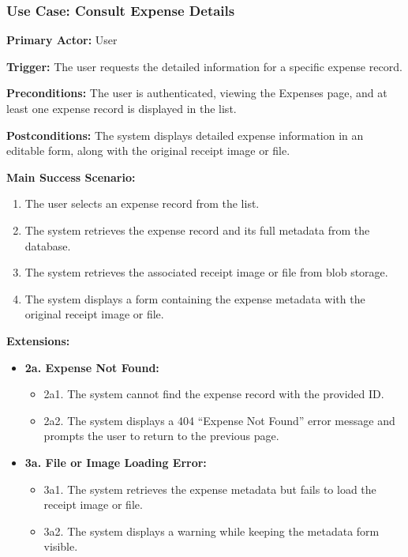 \subsubsection{\textbf{Use Case: Consult Expense Details}}

\textbf{Primary Actor:} User

\textbf{Trigger:} The user requests the detailed information for a specific expense record.

\textbf{Preconditions:} The user is authenticated, viewing the Expenses page, and at least one expense record is displayed in the list.

\textbf{Postconditions:} The system displays detailed expense information in an editable form, along with the original receipt image or file.

\vspace{0.5cm}

\textbf{Main Success Scenario:}

\begin{enumerate} [leftmargin=0.75cm, noitemsep]
    \item The user selects an expense record from the list.
    \item The system retrieves the expense record and its full metadata from the database.
    \item The system retrieves the associated receipt image or file from blob storage.
    \item The system displays a form containing the expense metadata with the original receipt image or file.
\end{enumerate}

\vspace{0.3cm}

\textbf{Extensions:}

\begin{itemize} [label={}, leftmargin=0.75cm, noitemsep]

    \item \textbf{2a. Expense Not Found:}
    \begin{itemize} [label={}, leftmargin=0.75cm, noitemsep]
        \item 2a1. The system cannot find the expense record with the provided ID.
        \item 2a2. The system displays a 404 ``Expense Not Found'' error message and prompts the user to return to the previous page.
    \end{itemize}

    \item \textbf{3a. File or Image Loading Error:}
    \begin{itemize} [label={}, leftmargin=0.75cm, noitemsep]
        \item 3a1. The system retrieves the expense metadata but fails to load the receipt image or file.
        \item 3a2. The system displays a warning while keeping the metadata form visible.
    \end{itemize}

\end{itemize}

\vspace{0.3cm}